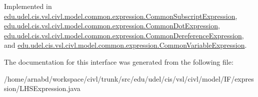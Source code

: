 Implemented in \hyperlink{classedu_1_1udel_1_1cis_1_1vsl_1_1civl_1_1model_1_1common_1_1expression_1_1CommonSubscriptExpression_ad27e0e339525409d75cb2c6918144b05}{edu.\+udel.\+cis.\+vsl.\+civl.\+model.\+common.\+expression.\+Common\+Subscript\+Expression}, \hyperlink{classedu_1_1udel_1_1cis_1_1vsl_1_1civl_1_1model_1_1common_1_1expression_1_1CommonDotExpression_a4ef9d18ad210aae6c830b865d8361357}{edu.\+udel.\+cis.\+vsl.\+civl.\+model.\+common.\+expression.\+Common\+Dot\+Expression}, \hyperlink{classedu_1_1udel_1_1cis_1_1vsl_1_1civl_1_1model_1_1common_1_1expression_1_1CommonDereferenceExpression_a482fe58903d263631de6eb1fc9012287}{edu.\+udel.\+cis.\+vsl.\+civl.\+model.\+common.\+expression.\+Common\+Dereference\+Expression}, and \hyperlink{classedu_1_1udel_1_1cis_1_1vsl_1_1civl_1_1model_1_1common_1_1expression_1_1CommonVariableExpression_a550b44a0bf02e6bcb71a4679223d6282}{edu.\+udel.\+cis.\+vsl.\+civl.\+model.\+common.\+expression.\+Common\+Variable\+Expression}.



The documentation for this interface was generated from the following file\+:\begin{DoxyCompactItemize}
\item 
/home/arnabd/workspace/civl/trunk/src/edu/udel/cis/vsl/civl/model/\+I\+F/expression/L\+H\+S\+Expression.\+java\end{DoxyCompactItemize}
